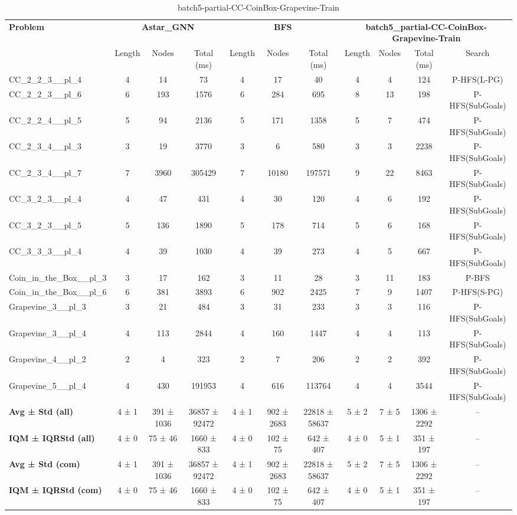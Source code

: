 \begin{table}[!ht]
\centering
\scriptsize
\begin{tabular}{l|ccc|ccc|cccc}
\multirow{2}{*}{\textbf{Problem}} & \multicolumn{3}{c|}{\textbf{Astar\_GNN}} & \multicolumn{3}{c|}{\textbf{BFS}} & \multicolumn{4}{c}{\textbf{batch5\_partial-CC-CoinBox-Grapevine-Train}} \\
\cline{2-11}
& Length & Nodes & Total (ms) & Length & Nodes & Total (ms) & Length & Nodes & Total (ms) & Search \\
\hline
CC\_2\_2\_3\_\_pl\_4 & 4 & 14 & 73 & 4 & 17 & 40 & 4 & 4 & 124 & P-HFS(L-PG) \\
CC\_2\_2\_3\_\_pl\_6 & 6 & 193 & 1576 & 6 & 284 & 695 & 8 & 13 & 198 & P-HFS(SubGoals) \\
CC\_2\_2\_4\_\_pl\_5 & 5 & 94 & 2136 & 5 & 171 & 1358 & 5 & 7 & 474 & P-HFS(SubGoals) \\
CC\_2\_3\_4\_\_pl\_3 & 3 & 19 & 3770 & 3 & 6 & 580 & 3 & 3 & 2238 & P-HFS(SubGoals) \\
CC\_2\_3\_4\_\_pl\_7 & 7 & 3960 & 305429 & 7 & 10180 & 197571 & 9 & 22 & 8463 & P-HFS(SubGoals) \\
CC\_3\_2\_3\_\_pl\_4 & 4 & 47 & 431 & 4 & 30 & 120 & 4 & 6 & 192 & P-HFS(SubGoals) \\
CC\_3\_2\_3\_\_pl\_5 & 5 & 136 & 1890 & 5 & 178 & 714 & 5 & 6 & 168 & P-HFS(SubGoals) \\
CC\_3\_3\_3\_\_pl\_4 & 4 & 39 & 1030 & 4 & 39 & 273 & 4 & 5 & 667 & P-HFS(SubGoals) \\
Coin\_in\_the\_Box\_\_pl\_3 & 3 & 17 & 162 & 3 & 11 & 28 & 3 & 11 & 183 & P-BFS \\
Coin\_in\_the\_Box\_\_pl\_6 & 6 & 381 & 3893 & 6 & 902 & 2425 & 7 & 9 & 1407 & P-HFS(S-PG) \\
Grapevine\_3\_\_pl\_3 & 3 & 21 & 484 & 3 & 31 & 233 & 3 & 3 & 116 & P-HFS(SubGoals) \\
Grapevine\_3\_\_pl\_4 & 4 & 113 & 2844 & 4 & 160 & 1447 & 4 & 4 & 113 & P-HFS(SubGoals) \\
Grapevine\_4\_\_pl\_2 & 2 & 4 & 323 & 2 & 7 & 206 & 2 & 2 & 392 & P-HFS(SubGoals) \\
Grapevine\_5\_\_pl\_4 & 4 & 430 & 191953 & 4 & 616 & 113764 & 4 & 4 & 3544 & P-HFS(SubGoals) \\
\hline
\textbf{Avg ± Std (all)} & 4 ± 1 & 391 ± 1036 & 36857 ± 92472 & 4 ± 1 & 902 ± 2683 & 22818 ± 58637 & 5 ± 2 & 7 ± 5 & 1306 ± 2292 & -- \\
\textbf{IQM ± IQRStd (all)} & 4 ± 0 & 75 ± 46 & 1660 ± 833 & 4 ± 0 & 102 ± 75 & 642 ± 407 & 4 ± 0 & 5 ± 1 & 351 ± 197 & -- \\
\textbf{Avg ± Std (com)} & 4 ± 1 & 391 ± 1036 & 36857 ± 92472 & 4 ± 1 & 902 ± 2683 & 22818 ± 58637 & 5 ± 2 & 7 ± 5 & 1306 ± 2292 & -- \\
\textbf{IQM ± IQRStd (com)} & 4 ± 0 & 75 ± 46 & 1660 ± 833 & 4 ± 0 & 102 ± 75 & 642 ± 407 & 4 ± 0 & 5 ± 1 & 351 ± 197 & -- \\
\end{tabular}
\caption{batch5-partial-CC-CoinBox-Grapevine-Train}
\label{tab:batch5_partial_CC-CoinBox-Grapevine_comparison_train}
\end{table}
